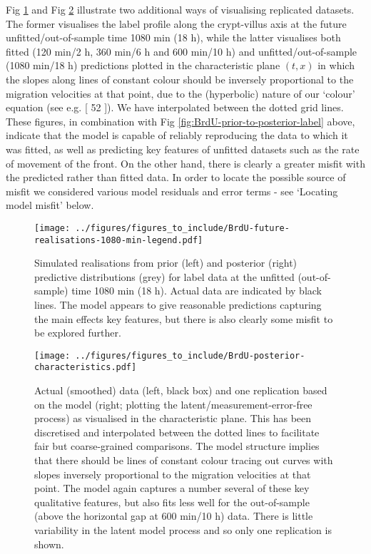 \documentclass[10pt,letterpaper]{article}
\providecommand{\DIFaddtex}[1]{{\protect\color{blue} \sf #1}} %
\providecommand{\DIFdeltex}[1]{{\protect\color{red} \scriptsize #1}} %
\providecommand{\DIFaddbegin}{} %
\providecommand{\DIFaddend}{} %
\providecommand{\DIFdelbegin}{} %
\providecommand{\DIFdelend}{} %
\providecommand{\DIFaddFL}[1]{\DIFadd{#1}} %
\providecommand{\DIFdelFL}[1]{\DIFdel{#1}} %
\providecommand{\DIFaddbeginFL}{} %
\providecommand{\DIFaddendFL}{} %
\providecommand{\DIFdelbeginFL}{} %
\providecommand{\DIFdelendFL}{} %
\providecommand{\DIFadd}[1]{\texorpdfstring{\DIFaddtex{#1}}{#1}} %
\providecommand{\DIFdel}[1]{\texorpdfstring{\DIFdeltex{#1}}{}} %
\begin{document}
Fig \ref{fig:BrdU-future-realisations-1080-min} and Fig
\ref{fig:BrdU-posterior-characteristics} illustrate two additional ways
of visualising replicated datasets. The former visualises the label
profile along the crypt-villus axis at the future unfitted/out-of-sample
time 1080 min (18 h), while the latter visualises both fitted (120 min/2
h, 360 min/6 h and 600 min/10 h) and unfitted/out-of-sample (1080 min/18
h) predictions plotted in the characteristic plane \((t,x)\) in which
the slopes along lines of constant colour should be inversely
proportional to the migration velocities at that point, due to the
(hyperbolic) nature of our `colour' equation (see e.g. {[}\DIFdelbegin \DIFdel{52}\DIFdelend \DIFaddbegin \DIFadd{59}\DIFaddend {]}). We
have interpolated between the dotted grid lines. These figures, in
combination with Fig \ref{fig:BrdU-prior-to-posterior-label} above,
indicate that the model is capable of reliably reproducing the data to
which it was fitted, as well as predicting key features of unfitted
datasets such as the rate of movement of the front. On the other hand,
there is clearly a greater misfit with the predicted rather than fitted
data. In order to locate the possible source of misfit we considered
various model residuals and error terms - see `Locating model misfit'
below.

\begin{figure}
\centering
\texttt{[image: ../figures/figures\_to\_include/BrdU-future-realisations-1080-min-legend.pdf]}
\caption{Simulated realisations from prior (left) and posterior (right)
predictive distributions (grey) for label data at the unfitted
(out-of-sample) time 1080 min (18 h). Actual data are indicated by black
lines. The model appears to give reasonable predictions capturing the
\DIFdelbeginFL \DIFdelFL{main effects}\DIFdelendFL \DIFaddbeginFL \DIFaddFL{key features}\DIFaddendFL , but there is also \DIFdelbeginFL \DIFdelFL{clearly }\DIFdelendFL some misfit to be explored
further.\label{fig:BrdU-future-realisations-1080-min}}
\end{figure}

\begin{figure}
\centering
\texttt{[image: ../figures/figures\_to\_include/BrdU-posterior-characteristics.pdf]}
\caption{Actual (smoothed) data (left, black box) and one replication
based on the model (right; plotting the latent/measurement-error-free
process) as visualised in the characteristic plane. This has been
discretised and interpolated between the dotted lines to facilitate fair
but coarse-grained comparisons. The model structure implies that there
should be lines of constant colour tracing out curves with slopes
inversely proportional to the migration velocities at that point. The
model again captures \DIFdelbeginFL \DIFdelFL{a number }\DIFdelendFL \DIFaddbeginFL \DIFaddFL{several }\DIFaddendFL of these key qualitative features, but \DIFdelbeginFL \DIFdelFL{also }\DIFdelendFL fits
less well for the out-of-sample (above the horizontal gap at 600 min/10
h) data. There is little variability in the latent model process and so
only one replication is
shown.\label{fig:BrdU-posterior-characteristics}}
\end{figure}
\end{document}

